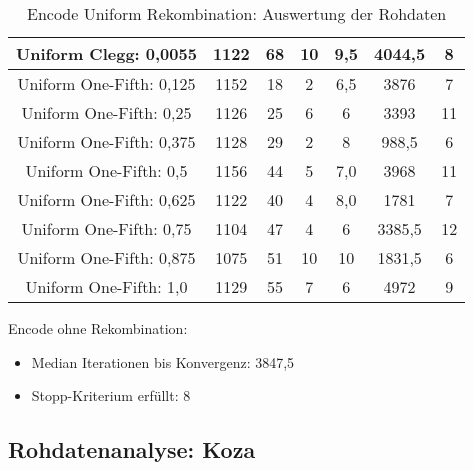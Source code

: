 \begin{table}[H]
\begin{tabular}{c | c | c | c | c | c | c}
		\hline
		Uniform Clegg: 0,0055 & 1122 & 68 & 10 & 9,5 & 4044,5 & 8\\
		\hline
		Uniform One-Fifth: 0,125 & 1152 & 18 & 2 & 6,5 & 3876 & 7\\
		\hline
		Uniform One-Fifth: 0,25 & 1126 & 25 & 6 & 6 & 3393 & 11\\
		\hline
		Uniform One-Fifth: 0,375 & 1128 & 29 & 2 & 8 & 988,5 & 6\\
		\hline
		Uniform One-Fifth: 0,5 & 1156 & 44 & 5 & 7,0 & 3968 & 11\\
		\hline
		Uniform One-Fifth: 0,625 & 1122 & 40 & 4 & 8,0 & 1781 & 7\\
		\hline
		Uniform One-Fifth: 0,75 & 1104 & 47 & 4 & 6 & 3385,5 & 12\\
		\hline
		Uniform One-Fifth: 0,875 & 1075 & 51 & 10 & 10 & 1831,5 & 6\\
		\hline
		Uniform One-Fifth: 1,0 & 1129 & 55 & 7 & 6 & 4972 & 9\\
	\end{tabular}
	\caption{Encode Uniform Rekombination: Auswertung der Rohdaten}
	\label{table:encodeUniformRohdaten}
\end{table}

Encode ohne Rekombination:
\begin{itemize}
	\item Median Iterationen bis Konvergenz: 3847,5
	\item Stopp-Kriterium erfüllt: 8
\end{itemize}


\subsection{Rohdatenanalyse: Koza}
\label{subsec:rohdatenKoza}

